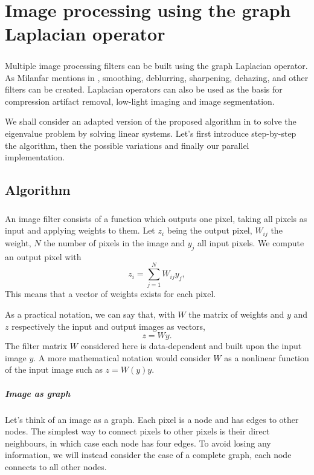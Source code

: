 \chapter{Image processing using the graph Laplacian operator}

\paragraph{}
Multiple image processing filters can be built using the graph Laplacian operator.
As Milanfar mentions in \cite{siam_slides_2016} \cite{glide_2014} \cite{talebi_nonlocal_2014}, smoothing, deblurring, sharpening, dehazing, and other filters can be created.
Laplacian operators can also be used as the basis for compression artifact removal, low-light imaging and image segmentation.

We shall consider an adapted version of the proposed algorithm in \cite{glide_2014} to solve the eigenvalue problem by solving linear systems.
Let's first introduce step-by-step the algorithm, then the possible variations and finally our parallel implementation.

\section{Algorithm}

\paragraph{}
An image filter consists of a function which outputs one pixel, taking all pixels as input and applying weights to them.
Let \(z_i\) being the output pixel, \(W_{ij}\) the weight, \(N\) the number of pixels in the image and \(y_j\) all input pixels.
We compute an output pixel with
\[z_i = \sum^{N}_{j=1} W_{ij}y_j,\]
This means that a vector of weights exists for each pixel.

As a practical notation, we can say that, with \(W\) the matrix of weights and \(y\) and \(z\) respectively the input and output images as vectors,
\[z = Wy.\]
The filter matrix \(W\) considered here is data-dependent and built upon the input image \(y\).
A more mathematical notation would consider \(W\) as a nonlinear function of the input image such as \(z = W(y) y\).

\paragraph{Image as graph}
Let's think of an image as a graph.
Each pixel is a node and has edges to other nodes.
The simplest way to connect pixels to other pixels is their direct neighbours, in which case each node has four edges.
To avoid losing any information, we will instead consider the case of a complete graph, each node connects to all other nodes.


